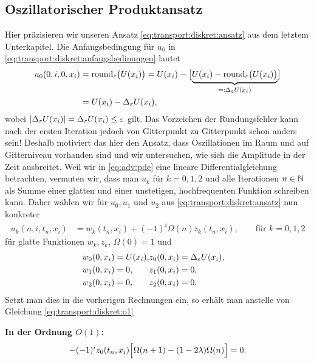 \subsection {Oszillatorischer Produktansatz}\label{sec:transport:osz}

Hier präzisieren wir unseren Ansatz \eqref{eq:transport:diskret:ansatz} aus dem letztem Unterkapitel. %
Die Anfangsbedingung für $u_0$ in \eqref{eq:transport:diskret:anfangsbedinungen} lautet
\begin{align*}
u_0(0, i, 0, x_i) &= \operatorname{round_\varepsilon}\bigl(U(x_i)\bigr) = U(x_i) - \bigl[ \underbrace{U(x_i) - \operatorname{round_\varepsilon}\bigl(U(x_i)\bigr)}_{=: \Delta_\varepsilon U(x_i)} \bigr]\\
&= U(x_i) - \Delta_\varepsilon U(x_i),
\end{align*}
wobei $\left| \Delta_\varepsilon U(x_i) \right| = \Delta_\varepsilon U(x_i) \leq \varepsilon$ gilt.
Das Vorzeichen der Rundungsfehler kann nach der ersten Iteration jedoch von Gitterpunkt zu Gitterpunkt schon anders sein!
Deshalb motiviert das hier den Ansatz, dass Oszillationen im Raum und auf Gitterniveau vorhanden sind und wir untersuchen, wie sich die Amplitude in der Zeit ausbreitet.
Weil wir in \eqref{eq:adv:pde} eine lineare Differentialgleichung betrachten, vermuten wir, dass man $u_k$ für $k = 0,1,2$ und alle Iterationen $n \in \mathbb N$ als Summe einer glatten und einer unstetigen, hochfrequenten Funktion schreiben kann.
Daher wählen wir für $u_0, u_1$ und $u_2$ aus \eqref{eq:transport:diskret:ansatz} nun konkreter 
\begin{align*}
u_k(n, i, t_n, x_i) &= w_k(t_n, x_i) + (-1)^i \Omega(n) z_k(t_n, x_i), \qquad \text{für $k = 0,1,2$}
\end{align*}
für glatte Funktionen $w_k, z_k$, $\Omega(0) = 1$ und
\begin{align}\label{eq:transport:osz:anfangsbedinungen}
\begin{split}
w_0(0, x_i) &= U(x_i),\\
w_1(0, x_i) &= 0,\\
w_2(0, x_i) &= 0,
\end{split}&
\begin{split}
z_0(0, x_i) &= \Delta_\varepsilon U(x_i),\\
z_1(0, x_i) &= 0,\\
z_2(0, x_i) &= 0.
\end{split}
\end{align}
Setzt man dies in die vorherigen Rechnungen ein, so erhält man anstelle von Gleichung \eqref{eq:transport:diskret:o1}

\vspace{0.4cm}
\noindent \textbf{In der Ordnung $O(1)$:}
\begin{align}\label{eq:transport:osz:o1} %
- (-1)^i z_0(t_n, x_i) \Bigl[ \Omega(n+1) - ( 1 - 2 \lambda ) \Omega(n) \Bigr] = 0.
\end{align}

